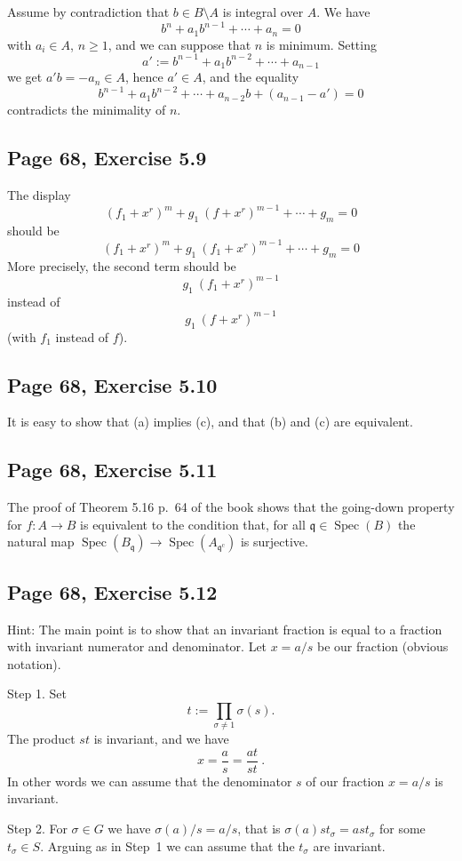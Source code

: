 \documentclass[parskip=half,fontsize=12pt]{scrartcl}%
\newcommand{\oo}{\operatorname}\newcommand{\ooo}{\operatorname*}
\newcommand{\mf}{\mathfrak}
\newcommand{\qqq}{\mf q}
\newcommand{\Spec}{\operatorname{Spec}}\newcommand{\Sp}{\operatorname{Spec}}
\begin{document}
Assume by contradiction that $b\in B\setminus A$ is integral over $A$. We have 
$$
b^n+a_1b^{n-1}+\cdots+a_n=0
$$ 
with $a_i\in A$, $n\ge1$, and we can suppose that $n$ is minimum. Setting 
$$
a':=b^{n-1}+a_1b^{n-2}+\cdots+a_{n-1}
$$
we get $a'b=-a_n\in A$, hence $a'\in A$, and the equality 
$$
b^{n-1}+a_1b^{n-2}+\cdots+a_{n-2}b+(a_{n-1}-a')=0
$$ 
contradicts the minimality of $n$. 

\subsection{Page 68, Exercise 5.9}%

The display 
$$
(f_1+x^r)^m+g_1\ (f+x^r)^{m-1}+\cdots+g_m=0
$$ 
should be 
$$
(f_1+x^r)^m+g_1\ (f_1+x^r)^{m-1}+\cdots+g_m=0
$$ 
More precisely, the second term should be $$g_1\ (f_1+x^r)^{m-1}$$ instead of $$g_1\ (f+x^r)^{m-1}$$ (with $f_1$ instead of $f$).

\subsection{Page 68, Exercise 5.10}%

It is easy to show that (a) implies (c), and that (b) and (c) are equivalent.

\subsection{Page 68, Exercise 5.11}%

The proof of Theorem 5.16 p.~64 of the book shows that the going-down property for $f:A\to B$ is equivalent to the condition that, for all $\qqq\in\Spec(B)$ the natural map $\Spec(B_\qqq)\to\Spec(A_{\qqq^{\oo c}})$ is surjective. 

\subsection{Page 68, Exercise 5.12}%

Hint: The main point is to show that an invariant fraction is equal to a fraction with invariant numerator and denominator. Let $x=a/s$ be our fraction (obvious notation). 

Step 1. Set 
$$
t:=\prod_{\sigma\ne1}\sigma(s).
$$ 
The product $st$ is invariant, and we have 
$$
x=\frac{a}{s}=\frac{at}{st}\ .
$$ 
In other words we can assume that the denominator $s$ of our fraction $x=a/s$ is invariant.

Step 2. For $\sigma\in G$ we have $\sigma(a)/s=a/s$, that is $\sigma(a)st_\sigma=ast_\sigma$ for some $t_\sigma\in S$. Arguing as in Step~1 we can assume that the $t_\sigma$ are invariant.
\end{document}
